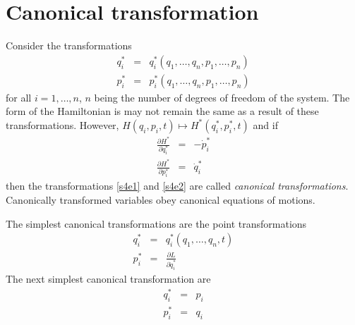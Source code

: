 \documentclass{article}
\numberwithin{equation}{section}
\theoremstyle{plain}
\numberwithin{thm}{section}
\theoremstyle{plain}
\numberwithin{prop}{section}
\theoremstyle{definition}
\numberwithin{defn}{section}
\theoremstyle{remark}
\begin{document}
\section{Canonical transformation}\label{s4}
Consider the transformations
\begin{eqnarray}
q^\ast_i &=& q^\ast_i(q_1, \ldots, q_n, p_1, \ldots, p_n) \label{s4e1} \\
p^\ast_i &=& p^\ast_i(q_1, \ldots, q_n, p_1, \ldots, p_n) \label{s4e2}
\end{eqnarray}
for all $i = 1, \ldots, n$, $n$ being the number of degrees of freedom of the
system. The form of the Hamiltonian is may not remain the same as a result of
these transformations. However, $H(q_i, p_i, t) \mapsto H^\ast(q^\ast_i, 
p^\ast_i, t)$ and if
\begin{eqnarray}
\frac{\partial H^\ast}{\partial q^\ast_i} &=& -\dot{p}^\ast_i \label{s4e3} \\
\frac{\partial H^\ast}{\partial p^\ast_i} &=&  \dot{q}^\ast_i \label{s4e4}
\end{eqnarray}
then the transformations \eqref{s4e1} and \eqref{s4e2} are called \emph{
canonical transformations}. Canonically transformed variables obey canonical
equations of motions.

The simplest canonical transformations are the point transformations
\begin{eqnarray}
q^\ast_i &=& q^\ast_i(q_1, \ldots, q_n, t)\label{s4e5} \\
p^\ast_i &=& \frac{\partial L}{\partial \dot{q}^\ast_i} \label{s4e6}
\end{eqnarray}
The next simplest canonical transformation are
\begin{eqnarray}
q^\ast_i &=& p_i \label{s4e7} \\
p^\ast_i &=& q_i \label{s4e8}
\end{eqnarray}
\end{document}
